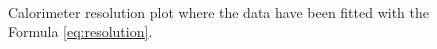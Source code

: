 \begin{figure}
	\centering
	 \\
	\caption{Calorimeter resolution plot where the data have been fitted with the Formula \ref{eq:resolution}.}
	\label{fig:sigma_su_e}
\end{figure}